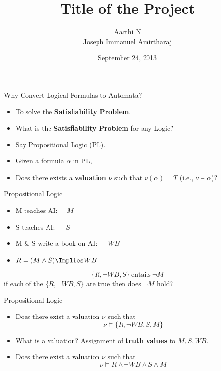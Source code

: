 \documentclass[xcolor=dvipsnames]{beamer}
\title[]{Title of the Project}
\author{Aarthi N\\Joseph Immanuel Amirtharaj}
\institute[SSNCE]{SSN College of Engineering, Chennai
}
\date{September 24, 2013}
\begin{document}
\begin{frame}
\maketitle
\end{frame}





\begin{frame}{Why Convert Logical Formulas to Automata?}
\pause
\begin{itemize}
\item To solve the {\bf Satisfiability Problem}.
\pause
\item What is the {\bf Satisfiability Problem} for any Logic?
\pause
\item Say Propositional Logic (PL).
\pause
\item Given a formula $\alpha$ in PL, 
\item Does there exists a {\bf valuation} $\nu$ such that $\nu(\alpha)=T$ (i.e., $\nu \models \alpha$)? 
\end{itemize}
\end{frame}
%
\begin{frame}{Propositional Logic}
\begin{itemize}
\item M teaches AI:$~~~~~~M$
\item S teaches AI:$~~~~~~~S$
\item M $\&$ S write a book on AI:$~~~~~~~WB$
%
\pause
\item $R=(M\land S)\Implies WB$
%
\pause

\end{itemize}
\[\{R,\lnot WB,S\}~\mbox{entails}~\lnot M\]
\pause
if each of the $\{R,\lnot WB,S\}$ are true then does $\lnot M$ hold?
\end{frame}

\begin{frame}{Propositional Logic}
\begin{itemize}
\item Does there exist a valuation $\nu$ such that 
\[\nu \models\{R,\lnot WB,S, M\}\]
\pause
\item What is a valuation?
\pause
Assignment of {\bf truth values} to $M,S,WB$.
\pause
\item Does there exist a valuation $\nu$ such that 
\[\nu \models R \land \lnot WB\land S\land M\]
\end{itemize}
\end{frame}
\end{document}
